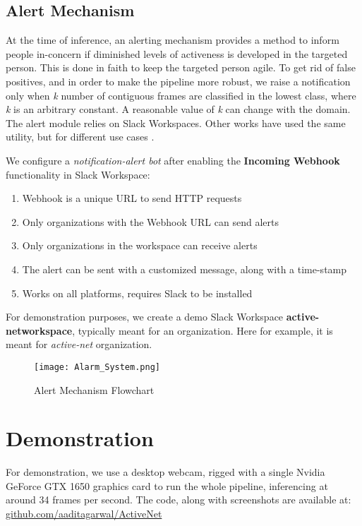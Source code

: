 \documentclass[sigconf]{acmart}
\begin{document}
\subsection{Alert Mechanism}\label{alert_mech}
At the time of inference, an alerting mechanism provides a method to inform people in-concern if diminished levels of activeness is developed in the targeted person. This is done in faith to keep the targeted person agile. To get rid of false positives, and in order to make the pipeline more robust, we raise a notification only when \textit{k} number of contiguous frames are classified in the lowest class, where \textit{k} is an arbitrary constant. A reasonable value of \textit{k} can change with the domain. The alert module relies on Slack Workspaces. Other works have used the same utility, but for different use cases \cite{doi:10.1002/aps3.11280} \cite{thesis_outlier}.

We configure a \textit{notification-alert bot} after enabling the \textbf{Incoming Webhook} functionality in Slack Workspace:
\begin{enumerate}
    \item Webhook is a unique URL to send HTTP requests
    \item Only organizations with the Webhook URL can send alerts
    \item Only organizations in the workspace can receive alerts
    \item The alert can be sent with a customized message, along with a time-stamp
    \item Works on all platforms, requires Slack to be installed
\end{enumerate}
For demonstration purposes, we create a demo Slack Workspace \textbf{active-networkspace}, typically meant for an organization. Here for example, it is meant for \textit{active-net} organization.
\begin{figure}[h]
\texttt{[image: Alarm\_System.png]}
\vspace{-0.25cm}
\caption{Alert Mechanism Flowchart}
\label{Fig2}
\end{figure}
\section{Demonstration}
For demonstration, we use a desktop webcam, rigged with a single Nvidia GeForce GTX 1650 graphics card to run the whole pipeline, inferencing at around 34 frames per second. The code, along with screenshots are available at: \href{https://github.com/aaditagarwal/ActiveNet}{github.com/aaditagarwal/ActiveNet}
\end{document}
